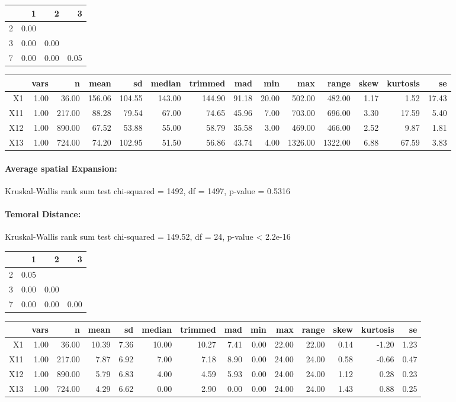 \documentclass[a4paper,headsepline,footsepline,fontsize=11pt,BCOR=12mm,DIV=12]{report}
\begin{document}
\begin{tabular}{rrrr}
  \hline
 & 1 & 2 & 3 \\ 
  \hline
2 & 0.00 &  &  \\ 
  3 & 0.00 & 0.00 &  \\ 
  7 & 0.00 & 0.00 & 0.05 \\ 
   \hline
\end{tabular}

\begin{tabular}{rrrrrrrrrrrrrr}
  \hline
 & vars & n & mean & sd & median & trimmed & mad & min & max & range & skew & kurtosis & se \\ 
  \hline
X1 & 1.00 & 36.00 & 156.06 & 104.55 & 143.00 & 144.90 & 91.18 & 20.00 & 502.00 & 482.00 & 1.17 & 1.52 & 17.43 \\ 
  X11 & 1.00 & 217.00 & 88.28 & 79.54 & 67.00 & 74.65 & 45.96 & 7.00 & 703.00 & 696.00 & 3.30 & 17.59 & 5.40 \\ 
  X12 & 1.00 & 890.00 & 67.52 & 53.88 & 55.00 & 58.79 & 35.58 & 3.00 & 469.00 & 466.00 & 2.52 & 9.87 & 1.81 \\ 
  X13 & 1.00 & 724.00 & 74.20 & 102.95 & 51.50 & 56.86 & 43.74 & 4.00 & 1326.00 & 1322.00 & 6.88 & 67.59 & 3.83 \\ 
   \hline
\end{tabular}

\paragraph{Average spatial Expansion:}
Kruskal-Wallis rank sum test chi-squared = 1492, df = 1497, p-value = 0.5316

\paragraph{Temoral Distance:}
Kruskal-Wallis rank sum test chi-squared = 149.52, df = 24, p-value < 2.2e-16

\begin{tabular}{rrrr}
  \hline
 & 1 & 2 & 3 \\ 
  \hline
2 & 0.05 &  &  \\ 
  3 & 0.00 & 0.00 &  \\ 
  7 & 0.00 & 0.00 & 0.00 \\ 
   \hline
\end{tabular}

\begin{tabular}{rrrrrrrrrrrrrr}
  \hline
 & vars & n & mean & sd & median & trimmed & mad & min & max & range & skew & kurtosis & se \\ 
  \hline
X1 & 1.00 & 36.00 & 10.39 & 7.36 & 10.00 & 10.27 & 7.41 & 0.00 & 22.00 & 22.00 & 0.14 & -1.20 & 1.23 \\ 
  X11 & 1.00 & 217.00 & 7.87 & 6.92 & 7.00 & 7.18 & 8.90 & 0.00 & 24.00 & 24.00 & 0.58 & -0.66 & 0.47 \\ 
  X12 & 1.00 & 890.00 & 5.79 & 6.83 & 4.00 & 4.59 & 5.93 & 0.00 & 24.00 & 24.00 & 1.12 & 0.28 & 0.23 \\ 
  X13 & 1.00 & 724.00 & 4.29 & 6.62 & 0.00 & 2.90 & 0.00 & 0.00 & 24.00 & 24.00 & 1.43 & 0.88 & 0.25 \\ 
   \hline
\end{tabular}
\end{document}
